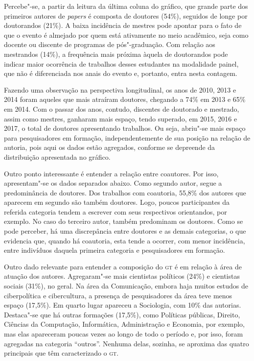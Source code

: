 
Percebe"-se, a partir da leitura da última coluna do gráfico, que grande
parte dos primeiros autores de \emph{papers} é composta de
doutores (54\%), seguidos de longe por doutorandos (21\%). A
baixa incidência de mestres pode apontar para o fato de que o evento
é almejado por quem está ativamente no meio acadêmico, seja como docente
ou discente de programas de pós"-graduação. Com relação aos
mestrandos (14\%), a frequência mais próxima àquela de doutorandos
pode indicar maior ocorrência de trabalhos desses estudantes na
modalidade painel, que não é diferenciada nos anais do evento e,
portanto, entra nesta contagem.

Fazendo uma observação na perspectiva longitudinal, os anos de 2010,
2013 e 2014 foram aqueles que mais atraíram doutores, chegando a 74\%
em 2013 e 65\% em 2014. Com o passar dos anos, contudo, discentes de
doutorado e mestrado, assim como mestres, ganharam mais espaço, tendo
superado, em 2015, 2016 e 2017, o total de doutores apresentando
trabalhos. Ou seja, abriu"-se mais espaço para pesquisadores em
formação, independentemente de sua posição na relação de autoria, pois
aqui os dados estão agregados, conforme se depreende da distribuição
apresentada no gráfico.

Outro ponto interessante é entender a relação entre coautores. Por
isso, apresentam"-se os dados separados abaixo. Como segundo autor,
segue a predominância de doutores. Dos trabalhos com coautoria,
55,8\% dos autores que aparecem em segundo são também doutores.
Logo, poucos participantes da referida categoria tendem a escrever com
seus respectivos orientandos, por exemplo. No caso do
terceiro autor, também predominam os doutores. Como se pode
perceber, há uma discrepância entre doutores e as demais categorias,
o que evidencia que, quando há coautoria, esta tende a ocorrer, com
menor incidência, entre indivíduos daquela primeira categoria e
pesquisadores em formação.



Outro dado relevante para entender a composição do \textsc{gt} é em relação à
área de atuação dos autores. Agregaram"-se mais cientistas
políticos (24\%) e cientistas sociais (31\%), no geral. Na área da
Comunicação, embora haja muitos estudos de ciberpolítica e cibercultura,
a presença de pesquisadores da área teve menos espaço (17,5\%). Em
quarto lugar apareceu a Sociologia, com 10\% das autorias. Destaca"-se
que há outras formações (17,5\%), como Políticas públicas, Direito,
Ciências da Computação, Informática, Administração e Economia, por
exemplo, mas elas apareceram poucas vezes ao longo de todo o período e,
por isso, foram agregadas na categoria ``outros''. Nenhuma delas,
sozinha, se aproxima das quatro principais que têm caracterizado o \textsc{gt}.

